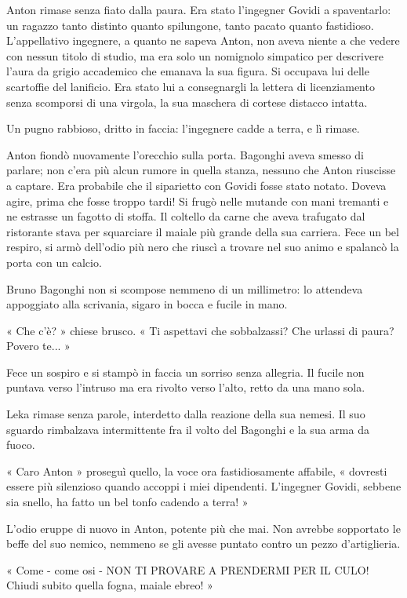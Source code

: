 Anton rimase senza fiato dalla paura. Era stato l'ingegner Govidi a spaventarlo: un ragazzo tanto distinto quanto spilungone, tanto pacato quanto fastidioso. L'appellativo ingegnere, a quanto ne sapeva Anton, non aveva niente a che vedere con nessun titolo di studio, ma era solo un nomignolo simpatico per descrivere l'aura da grigio accademico che emanava la sua figura. Si occupava lui delle scartoffie del lanificio. Era stato lui a consegnargli la lettera di licenziamento senza scomporsi di una virgola, la sua maschera di cortese distacco intatta.

Un pugno rabbioso, dritto in faccia: l'ingegnere cadde a terra, e lì rimase.

Anton fiondò nuovamente l'orecchio sulla porta. Bagonghi aveva smesso di parlare; non c'era più alcun rumore in quella stanza, nessuno che Anton riuscisse a captare. Era probabile che il siparietto con Govidi fosse stato notato. Doveva agire, prima che fosse troppo tardi! Si frugò nelle mutande con mani tremanti e ne estrasse un fagotto di stoffa. Il coltello da carne che aveva trafugato dal ristorante stava per squarciare il maiale più grande della sua carriera. Fece un bel respiro, si armò dell'odio più nero che riuscì a trovare nel suo animo e spalancò la porta con un calcio.

Bruno Bagonghi non si scompose nemmeno di un millimetro: lo attendeva appoggiato alla scrivania, sigaro in bocca e fucile in mano.

« Che c'è? » chiese brusco. « Ti aspettavi che sobbalzassi? Che urlassi di paura? Povero te... »

Fece un sospiro e si stampò in faccia un sorriso senza allegria. Il fucile non puntava verso l'intruso ma era rivolto verso l'alto, retto da una mano sola.

Leka rimase senza parole, interdetto dalla reazione della sua nemesi. Il suo sguardo rimbalzava intermittente fra il volto del Bagonghi e la sua arma da fuoco.

« Caro Anton » proseguì quello, la voce ora fastidiosamente affabile, « dovresti essere più silenzioso quando accoppi i miei dipendenti. L'ingegner Govidi, sebbene sia snello, ha fatto un bel tonfo cadendo a terra! »

L'odio eruppe di nuovo in Anton, potente più che mai. Non avrebbe sopportato le beffe del suo nemico, nemmeno se gli avesse puntato contro un pezzo d'artiglieria.

« Come - come osi - NON TI PROVARE A PRENDERMI PER IL CULO! Chiudi subito quella fogna, maiale ebreo! »

